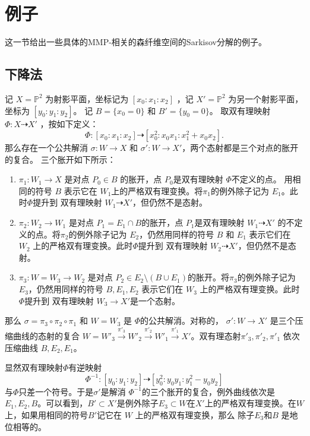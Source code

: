 \section{例子}
这一节给出一些具体的MMP-相关的森纤维空间的Sarkisov分解的例子。

\subsection{下降法}\label{example1}
记 $ X=\mathbb{P}^2 $ 为射影平面，坐标记为 $ [ x_0:x_1:x_2 ] $ ，记 $ X'=\mathbb{P}^2 $ 为另一个射影平面，坐标为 $ [ y_0:y_1:y_2 ] $。
记 $ B=\{x_0=0\} $ 和 $B'=\{y_{0}=0\} $。
取双有理映射 $ \Phi:X\dashrightarrow X' $ ，按如下定义：
\[ \Phi:[x_0:x_1:x_2]\dashrightarrow [x_0^2:x_0x_1:x_1^2+x_0x_2] .\]
那么存在一个公共解消 $\sigma: W\to X$ 和 $\sigma':W\to X'$，两个态射都是三个对点的胀开的复合。
三个胀开如下所示：
\begin{enumerate}
  \item $\pi_{1}:W_{1}\to X$ 是对点 $P_{0} \in B$ 的胀开，点 $P_{0}$是双有理映射  $\Phi$不定义的点。 用相同的符号 $B$ 表示它在  $W_{1}$上的严格双有理变换。将$\pi_{1}$的例外除子记为 $E_{1}$。此时$\Phi$提升到 双有理映射 $W_{1}\dashrightarrow X'$，但仍然不是态射。
  \item $\pi_{2}:W_{2}\to W_{1}$ 是对点 $P_{1}=E_{1} \cap B$的胀开，点 $P_{1}$是双有理映射 $  W_{1}\dashrightarrow X' $
的不定义的点。将$\pi_{2}$的例外除子记为 $E_{2}$，仍然用同样的符号 $B$ 和 $E_{1}$ 表示它们在 $W_{2}$ 上的严格双有理变换。此时$\Phi$提升到 双有理映射 $W_{2}\dashrightarrow X'$，但仍然不是态射。
  \item $\pi_{3}:W=W_{3}\to W_{2}$ 是对点 $P_{2} \in E_{2} \setminus (B\cup E_{1})$的胀开。将$\pi_{3}$的例外除子记为 $E_{3}$，仍然用同样的符号 $B,E_{1},E_{2}$ 表示它们在 $W_{3}$ 上的严格双有理变换。此时$\Phi$提升到 双有理映射 $W_{3}\to  X'$是一个态射。
\end{enumerate}
那么 $ \sigma=\pi_{3}\circ \pi_{2} \circ \pi_{1} $ 和 $ W=W_3 $ 是 $\Phi$的公共解消。对称的， $ \sigma':W\to X' $ 是三个压缩曲线的态射的复合  $W=W'_{3}\xrightarrow{\pi'_{3}} W'_{2}\xrightarrow{\pi'_{2}} W'_{1} \xrightarrow{\pi'_{1}} X'$。双有理态射$\pi'_{3},\pi'_{2},\pi'_{1}$ 依次压缩曲线 $ B,E_2,E_1 $。
\begin{remark}
  显然双有理映射$\Phi$有逆映射
\[ \Phi^{-1}:[y_0:y_1:y_2]\dashrightarrow [y_0^2:y_0y_1:y_1^2-y_0y_2] \]
  与$\Phi $只差一个符号。于是$\sigma' $是解消 $\Phi^{-1}$的三个胀开的复合，例外曲线依次是$E_{1},E_{2},B$。可以看到，$B' \subset X'$是例外除子$E_{3} \subset W$在$X'$上的严格双有理变换。在$W$ 上，如果用相同的符号$B'$记它在 $W$ 上的严格双有理变换，那么 除子$E_{3}$和$B$ 是地位相等的。
\end{remark}

